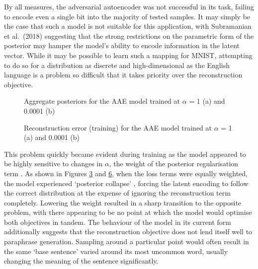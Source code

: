 \documentclass[12pt,a4paper]{article}
\begin{document}
\noindent By all measures, the adversarial autoencoder was not successful in its task, failing to encode even a single bit into the majority of tested samples. It may simply be the case that such a model is not suitable for this application, with Subramanian et al.\ (2018)\nocite{transfer} suggesting that the strong restrictions on the parametric form of the posterior may hamper the model's ability to encode information in the latent vector. While it may be possible to learn such a mapping for MNIST, attempting to do so for a distribution as discrete and high-dimensional as the English language is a problem so difficult that it takes priority over the reconstruction objective.

\begin{figure}[ht!]
  \centering
  \begin{subfigure}[t]{0.49\textwidth}
     \centering
      
      \caption{}
      \label{good_hist}
  \end{subfigure}
  \hfill
  \begin{subfigure}[t]{0.49\textwidth}
         \centering
      
      \caption{}
      \label{bad_hist}
  \end{subfigure}
  \caption{Aggregate posteriors for the AAE model trained at $\alpha$ = 1 (a) and 0.0001 (b) }
  \label{hists}
\end{figure}

\begin{figure}[htp!]
  \centering
  \begin{subfigure}[t]{0.49\textwidth}
         \centering
      
      \caption{}
      \label{good_line}
  \end{subfigure}
  \hfill
  \begin{subfigure}[t]{0.49\textwidth}
         \centering
      
      \caption{}
      \label{bad_line}
  \end{subfigure}
  \caption{Reconstruction error (training) for the AAE model trained at $\alpha$ = 1 (a) and 0.0001 (b)}
  \label{lines}
\end{figure}

This problem quickly became evident during training as the model appeared to be highly sensitive to changes in $\alpha$, the weight of the posterior regularisation term . As shown in Figures \ref{hists} and \ref{lines}, when the loss terms were equally weighted, the model experienced `posterior collapse' \cite{cont}, forcing the latent encoding to follow the correct distribution at the expense of ignoring the reconstruction term completely. Lowering the weight resulted in a sharp transition to the opposite problem, with there appearing to be no point at which the model would optimise both objectives in tandem. The behaviour of the model in its current form additionally suggests that the reconstruction objective does not lend itself well to paraphrase generation. Sampling around a particular point would often result in the same `base sentence' varied around its most uncommon word, usually changing the meaning of the sentence significantly.
\end{document}
